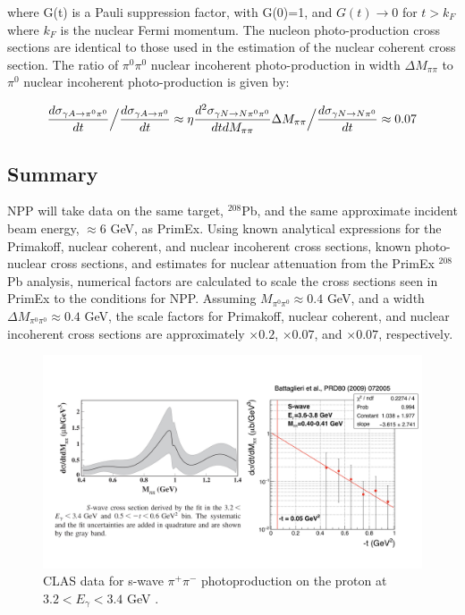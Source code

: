 where G(t) is a Pauli suppression factor, with G(0)=1, and $G(t)\rightarrow 0$ for $t> k_F$ where $k_F$ is the nuclear Fermi momentum.   The nucleon photo-production cross sections are identical to those used in the estimation of the nuclear coherent cross section.    The ratio of  $\pi^0 \pi^0$ nuclear incoherent photo-production in  width $\Delta M_{\pi \pi}$  to $\pi^0$ nuclear incoherent photo-production is given by: 

$$  {d\sigma_{\gamma A \rightarrow  \pi^0 \pi^0} \over dt}  \Big/ { d\sigma_{\gamma A \rightarrow  \pi^0} \over dt}  \approx \eta 
 {d^2\sigma_{\gamma N \rightarrow N \pi^0 \pi^0} \over dt dM_{\pi \pi} }  \Delta M_{\pi \pi}\Big/ { d\sigma_{\gamma N \rightarrow N \pi^0} \over dt} \approx 0.07 $$

\subsection{Summary}
NPP will take data on the same target, $^{208}$Pb, and the same approximate incident beam energy, $\approx 6$ GeV, as PrimEx. Using known analytical expressions for the Primakoff, nuclear coherent, and nuclear incoherent cross sections, known photo-nuclear cross sections, and estimates for nuclear attenuation from the PrimEx $^{208}$Pb analysis, numerical factors are calculated to scale the cross sections seen in PrimEx to the conditions for NPP.  Assuming $M_{\pi^0 \pi^0} \approx 0.4$ GeV, and a width  $\Delta M_{\pi^0 \pi^0} \approx 0.4$ GeV, the scale factors for Primakoff, nuclear coherent, and nuclear incoherent cross sections are approximately $\times 0.2$, $\times 0.07$, and $\times 0.07$, respectively. 

\begin{figure}
\centering
\includegraphics[width=6in]{figures/f0_500.png}
\caption{CLAS data for s-wave $\pi^+ \pi^-$ photoproduction on the proton at $3.2 < E_\gamma < 3.4$ GeV \cite{Battaglieri:2009aa}. }
\label{f0_500}
\end{figure}

